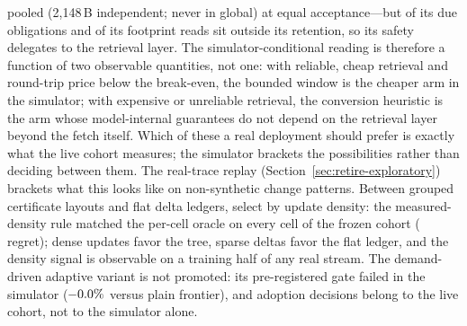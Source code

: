 \ExpBhBreakEvenPooled{} pooled (2{,}148\,B independent; never in
global) at equal acceptance---but \ExpBhDueExposed{} of its due
obligations and \ExpBhFootprintExposed{} of its footprint reads sit
outside its retention, so its safety delegates to the retrieval
layer. The simulator-conditional reading is therefore a function of
two observable quantities, not one: with reliable, cheap retrieval and
round-trip price below the break-even, the bounded window is the
cheaper arm in the simulator; with expensive or unreliable retrieval,
the conversion heuristic is the arm whose model-internal guarantees
do not depend on the retrieval layer beyond the
fetch itself. Which of these a real deployment should prefer is
exactly what the live cohort measures; the simulator brackets the
possibilities rather than deciding between them. The real-trace replay
(Section~\ref{sec:retire-exploratory}) brackets what this looks like
on non-synthetic change patterns. Between grouped
certificate layouts and flat delta ledgers, select by update density:
the measured-density rule matched the per-cell oracle on every cell of
the frozen cohort (\RetwoDensityRegret{} regret); dense updates favor
the tree, sparse deltas favor the flat ledger, and the density signal
is observable on a training half of any real stream. The
demand-driven adaptive variant is not promoted: its pre-registered
gate failed in the simulator
($-0.0\%{}$ versus plain frontier), and adoption
decisions belong to the live cohort, not to the simulator alone.

